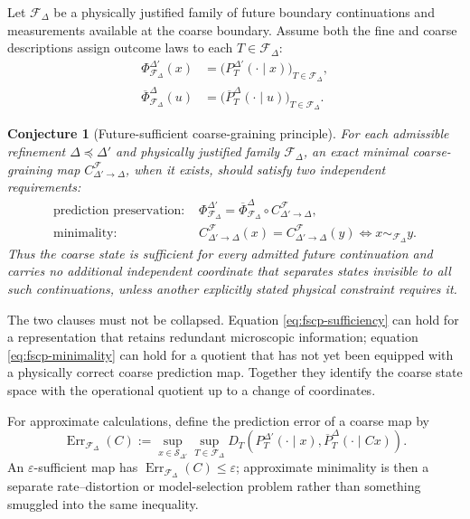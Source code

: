\documentclass[11pt]{article}
\newtheorem{conjecture}[definition]{Conjecture}
\newcommand{\F}{\mathcal F}
\newcommand{\Sspace}{\mathcal S}
\newcommand{\eps}{\varepsilon}
\begin{document}
Let $\F_{\Delta}$ be a physically justified family of future boundary continuations and measurements available at the coarse boundary. Assume both the fine and coarse descriptions assign outcome laws to each $T\in\F_{\Delta}$:
\begin{align}
  \Phi_{\F_{\Delta}}^{\Delta'}(x)
  &=\bigl(P_{T}^{\Delta'}(\cdot\mid x)\bigr)_{T\in\F_{\Delta}},\\
  \overline\Phi_{\F_{\Delta}}^{\Delta}(u)
  &=\bigl(\overline P_{T}^{\Delta}(\cdot\mid u)\bigr)_{T\in\F_{\Delta}}.
  \label{eq:qg-future-maps}
\end{align}

\begin{conjecture}[Future-sufficient coarse-graining principle]
\label{conj:fscp}
For each admissible refinement $\Delta\preceq\Delta'$ and physically justified family $\F_{\Delta}$, an exact minimal coarse-graining map $C^{\F}_{\Delta'\to\Delta}$, when it exists, should satisfy two independent requirements:
\begin{align}
\text{prediction preservation: }&
\Phi_{\F_{\Delta}}^{\Delta'}
=
\overline\Phi_{\F_{\Delta}}^{\Delta}
\circ C^{\F}_{\Delta'\to\Delta},
\label{eq:fscp-sufficiency}\\
\text{minimality: }&
C^{\F}_{\Delta'\to\Delta}(x)
=C^{\F}_{\Delta'\to\Delta}(y)
\Longleftrightarrow
x\sim_{\F_{\Delta}}y.
\label{eq:fscp-minimality}
\end{align}
Thus the coarse state is sufficient for every admitted future continuation and carries no additional independent coordinate that separates states invisible to all such continuations, unless another explicitly stated physical constraint requires it.
\end{conjecture}

The two clauses must not be collapsed. Equation \eqref{eq:fscp-sufficiency} can hold for a representation that retains redundant microscopic information; equation \eqref{eq:fscp-minimality} can hold for a quotient that has not yet been equipped with a physically correct coarse prediction map. Together they identify the coarse state space with the operational quotient up to a change of coordinates.

For approximate calculations, define the prediction error of a coarse map by
\begin{equation}
  \operatorname{Err}_{\F_{\Delta}}(C)
  :=
  \sup_{x\in\Sspace_{\Delta'}}
  \sup_{T\in\F_{\Delta}}
  D_T\!\left(
    P_T^{\Delta'}(\cdot\mid x),
    \overline P_T^{\Delta}(\cdot\mid Cx)
  \right).
  \label{eq:qg-approx-error}
\end{equation}
An $\eps$-sufficient map has $\operatorname{Err}_{\F_{\Delta}}(C)\le\eps$; approximate minimality is then a separate rate--distortion or model-selection problem rather than something smuggled into the same inequality.
\end{document}
